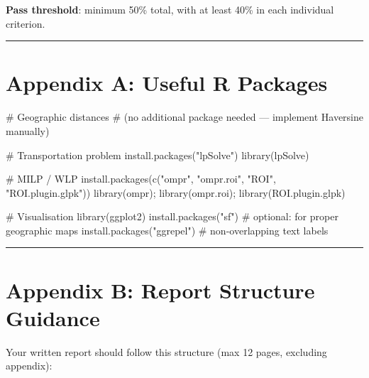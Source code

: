\documentclass[
  a4paper,
]{article}
\newenvironment{Shaded}{\begin{snugshade}}{\end{snugshade}}
\newcommand{\CommentTok}[1]{\textcolor[rgb]{0.37,0.37,0.37}{#1}}
\newcommand{\FunctionTok}[1]{\textcolor[rgb]{0.28,0.35,0.67}{#1}}
\newcommand{\NormalTok}[1]{\textcolor[rgb]{0.00,0.23,0.31}{#1}}
\newcommand{\StringTok}[1]{\textcolor[rgb]{0.13,0.47,0.30}{#1}}
\begin{document}
\textbf{Pass threshold}: minimum 50\% total, with at least 40\% in each
individual criterion.

\begin{center}\rule{0.5\linewidth}{0.5pt}\end{center}

\section{Appendix A: Useful R
Packages}\label{appendix-a-useful-r-packages}

\begin{Shaded}
\begin{Highlighting}[]
\CommentTok{\# Geographic distances}
\CommentTok{\# (no additional package needed — implement Haversine manually)}

\CommentTok{\# Transportation problem}
\FunctionTok{install.packages}\NormalTok{(}\StringTok{"lpSolve"}\NormalTok{)}
\FunctionTok{library}\NormalTok{(lpSolve)}

\CommentTok{\# MILP / WLP}
\FunctionTok{install.packages}\NormalTok{(}\FunctionTok{c}\NormalTok{(}\StringTok{"ompr"}\NormalTok{, }\StringTok{"ompr.roi"}\NormalTok{, }\StringTok{"ROI"}\NormalTok{, }\StringTok{"ROI.plugin.glpk"}\NormalTok{))}
\FunctionTok{library}\NormalTok{(ompr); }\FunctionTok{library}\NormalTok{(ompr.roi); }\FunctionTok{library}\NormalTok{(ROI.plugin.glpk)}

\CommentTok{\# Visualisation}
\FunctionTok{library}\NormalTok{(ggplot2)}
\FunctionTok{install.packages}\NormalTok{(}\StringTok{"sf"}\NormalTok{)       }\CommentTok{\# optional: for proper geographic maps}
\FunctionTok{install.packages}\NormalTok{(}\StringTok{"ggrepel"}\NormalTok{)  }\CommentTok{\# non{-}overlapping text labels}
\end{Highlighting}
\end{Shaded}

\begin{center}\rule{0.5\linewidth}{0.5pt}\end{center}

\section{Appendix B: Report Structure
Guidance}\label{appendix-b-report-structure-guidance}

Your written report should follow this structure (max 12 pages,
excluding appendix):
\end{document}
